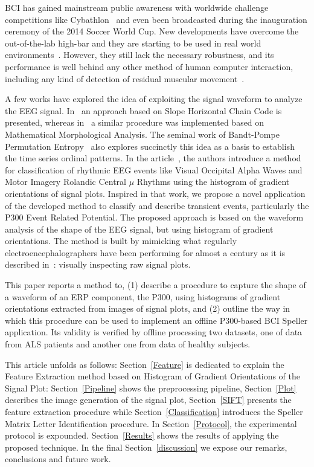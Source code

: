 \documentclass[utf8]{frontiersSCNS} %
\begin{document}
BCI has gained mainstream public awareness with worldwide challenge competitions like Cybathlon~\citep{Riener2014,cybathlon2} and even been broadcasted during the inauguration ceremony of the 2014 Soccer World Cup.  New developments have overcome the out-of-the-lab high-bar and they are starting to be used in real world environments~\citep{Guger2017,Huggins2016}.  However, they still lack the necessary robustness, and its performance is well behind any other method of human computer interaction, including any kind of detection of residual muscular movement~\citep{Clerc}.

A few works have explored the idea of exploiting the signal waveform to analyze the EEG signal.  In~\citep{Alvarado-Gonzalez2016} an approach based on Slope Horizontal Chain Code is presented, whereas in~\citep{Yamaguchi2009} a similar procedure was implemented based on Mathematical Morphological Analysis.  The seminal work of Bandt-Pompe Permutation Entropy~\citep{Berger2017} also explores succinctly this idea as a basis to establish the time series ordinal patterns.  In the article~\citep{Ramele2016},  the authors introduce a method for classification of rhythmic EEG events like Visual Occipital Alpha Waves  and Motor Imagery Rolandic Central $\mu$ Rhythms using the histogram of gradient orientations of signal plots.  Inspired in that work, we propose a novel application of the developed method to classify and describe transient events, particularly the P300 Event Related Potential.  
The proposed approach is based on the waveform analysis of the shape of the EEG signal, but using histogram of gradient orientations. The method is built by mimicking what regularly electroencephalographers have been performing for almost a century as it is described in~\citep{Hartman2005}: visually inspecting raw signal plots.

This paper reports a method to, (1) describe a procedure to capture the shape of a waveform of an ERP component, the P300, using histograms of gradient orientations extracted from images of signal plots, and (2) outline the way in which this procedure can be used to implement an offline P300-based BCI Speller application. Its validity is verified by offline processing two datasets, one of data from ALS patients and another one from data of healthy subjects. 

This article unfolds as follows: Section~\ref{Feature} is dedicated to explain the Feature Extraction method based on Histogram of Gradient Orientations of the Signal Plot: Section~\ref{Pipeline} shows the preprocessing pipeline,  Section~\ref{Plot}  describes the image generation of the signal plot, Section~\ref{SIFT}  presents the feature extraction procedure while  Section~\ref{Classification}  introduces the Speller Matrix Letter Identification procedure.  In Section~\ref{Protocol}, the experimental protocol is expounded. Section~\ref{Results} shows the results of applying the proposed technique.  In the final Section~\ref{discussion}  we expose our remarks, conclusions and future work.
\end{document}
